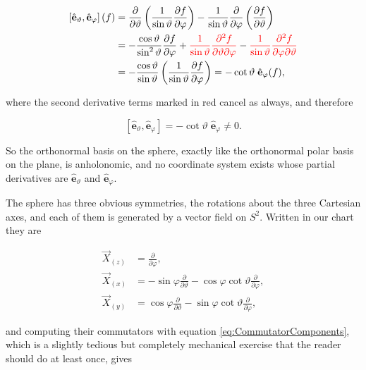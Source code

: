         \begin{align*}
            \left[\hat{\mathbf{e}}_{\vartheta},\hat{\mathbf{e}}_{\varphi}\right](f) &= \frac{\partial}{\partial \vartheta}\left(\frac{1}{\sin\vartheta}\frac{\partial f}{\partial \varphi}\right) - \frac{1}{\sin\vartheta}\frac{\partial}{\partial \varphi}\left(\frac{\partial f}{\partial \vartheta}\right)\\
            &= -\frac{\cos\vartheta}{\sin^2\vartheta}\frac{\partial f}{\partial \varphi} + {\color{red}\frac{1}{\sin\vartheta}\frac{\partial^2 f}{\partial \vartheta \partial \varphi}} - {\color{red}\frac{1}{\sin\vartheta}\frac{\partial^2 f}{\partial \varphi \partial \vartheta}}\\
            &= -\frac{\cos\vartheta}{\sin\vartheta}\left(\frac{1}{\sin\vartheta}\frac{\partial f}{\partial \varphi}\right) = -\cot\vartheta\;\hat{\mathbf{e}}_{\varphi}(f),
        \end{align*}

        where the second derivative terms marked in red cancel as always, and therefore

        \begin{equation}
            \left[\hat{\mathbf{e}}_{\vartheta},\hat{\mathbf{e}}_{\varphi}\right] = -\cot\vartheta\;\hat{\mathbf{e}}_{\varphi} \neq 0.
        \end{equation}

        So the orthonormal basis on the sphere, exactly like the orthonormal polar basis on the plane, is anholonomic, and no coordinate system exists whose partial derivatives are $\hat{\mathbf{e}}_{\vartheta}$ and $\hat{\mathbf{e}}_{\varphi}$.

        The sphere has three obvious symmetries, the rotations about the three Cartesian axes, and each of them is generated by a vector field on $S^2$. Written in our chart they are

        \begin{align}
            \Vec{X}_{(z)} &= \frac{\partial}{\partial \varphi},\\
            \Vec{X}_{(x)} &= -\sin\varphi\frac{\partial}{\partial \vartheta} - \cos\varphi\cot\vartheta\frac{\partial}{\partial \varphi},\\
            \Vec{X}_{(y)} &= \cos\varphi\frac{\partial}{\partial \vartheta} - \sin\varphi\cot\vartheta\frac{\partial}{\partial \varphi},
        \end{align}

        and computing their commutators with equation \ref{eq:CommutatorComponents}, which is a slightly tedious but completely mechanical exercise that the reader should do at least once, gives

